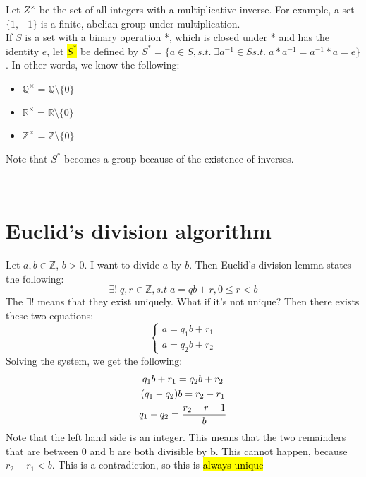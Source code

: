 \documentclass[12pt]{report}
\newcommand{\remarks}[1]{{\leavevmode\color{blue} #1}}
\newcommand{\notes}[1]{{\leavevmode\color{OliveGreen} #1}}
\begin{document}
	\vskip 0.2in
	\notes{
		Let $Z^{\times}$ be the set of all integers with a multiplicative inverse. For example, a set $\{1,-1\}$ is a finite, abelian group under multiplication. \\
		If $S$ is a set with a binary operation *, which is closed under * and has the identity $e$, let \hl{$S^*$} be defined by $S^*=\{a\in S, s.t.\; \exists a^{-1}\in S s.t.\; a*a^{-1}=a^{-1}*a=e\}$. In other words, we know the following: 
		\begin{itemize}
			\item $\mathbb{Q}^\times = \mathbb{Q}\setminus \{0\}$\\
			\item $\mathbb{R}^\times = \mathbb{R}\setminus \{0\}$\\
			\item $\mathbb{Z}^\times = \mathbb{Z}\setminus \{0\}$\\
		\end{itemize}
		Note that $S^*$ becomes a group because of the existence of inverses. 
	}\\
	\vskip 0.2in
	\section{Euclid's division algorithm}
	\notes{
		Let $a,b\in\mathbb{Z}$, $b>0$. I want to divide $a$ by $b$. 
		\vskip 0.1in
		Then Euclid's division lemma states the following: 
		$$\exists!\; q, r\in \mathbb{Z}, s.t \; a=qb+r, 0\leq r<b$$
		The $\exists !$ means that they exist uniquely. 
	}
	\vskip 0.05in
	\remarks{
		What if it's not unique? Then there exists these two equations: $$\begin{cases}a=q_1b+r_1\\ a=q_2b+r_2\end{cases}$$
		Solving the system, we get the following: 
		\begin{gather}
			\setcounter{equation}{0}
			q_1b+r_1=q_2b+r_2\\
			(q_1-q_2)b=r_2-r_1\\
			q_1-q_2=\frac{r_2-r-1}{b}
		\end{gather}
		Note that the left hand side is an integer. This means that the two remainders that are between 0 and b are both divisible by b. This cannot happen, because $r_2-r_1<b$. This is a contradiction, so this is \hl{always unique}
	}
\end{document}
